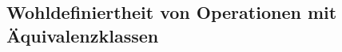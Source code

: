 \Tut\subsection{Wohldefiniertheit von Operationen mit \"Aquivalenzklassen}
\label{subsub:wohldefiniertheit}

